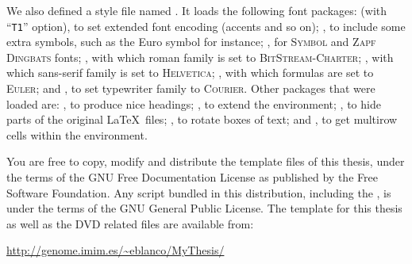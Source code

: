 We also defined a style file named . It loads the
following font packages:  (with ``\texttt{T1}'' option),
to set extended font encoding (accents and so on); , to
include some extra symbols, such as the Euro symbol for instance;
, for \textsc{Symbol} and \textsc{Zapf Dingbats} fonts;
, with which roman family is set to \textsc{BitStream-Charter}; 
, with which sans-serif family is set to \textsc{Helvetica}; 
, with which formulas are set to \textsc{Euler}; 
and , to set typewriter family to \textsc{Courier}. 
Other packages that were loaded are: , to produce nice
headings; , to extend the  environment;
, to hide parts of the original \LaTeX\ files;
, to rotate boxes of text; and , to get
multirow cells within the  environment.
%



You are free to copy, modify and distribute the template files of this
thesis, under the terms of the GNU Free Documentation License as
published by the Free Software Foundation.  Any script bundled in this
distribution, including the , is under the terms of the
GNU General Public License. The template for this thesis
as well as the DVD related files are available from:

\centerline{\url{http://genome.imim.es/~eblanco/MyThesis/}}



{}

